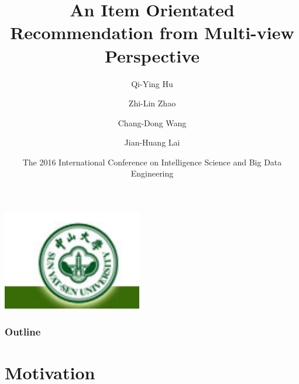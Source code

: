 \documentclass{beamer}
\title[MVIR] %
{An Item Orientated Recommendation from Multi-view Perspective}
\author[Hu \emph{et al.}] %
{Qi-Ying Hu\inst{1} \and Zhi-Lin Zhao\inst{1}\\
\and Chang-Dong Wang\inst{1}
\and Jian-Huang Lai\inst{1}}%
\institute[Sun Yat-sen University] %
{
  \inst{1}%
  School of Data and Computer Science\\
  Sun Yat-sen University, P. R. China.
}
\date[IScIDE 2016] %
{The 2016 International Conference on Intelligence Science and Big Data Engineering}
\begin{document}
\begin{frame}
  \titlepage
  \includegraphics[width=0.18\linewidth]{Figures/Sysu_logo}
\end{frame}

\begin{frame}
  \frametitle{Outline}
  \tableofcontents%
\end{frame}





\section{Motivation}
\end{document}
